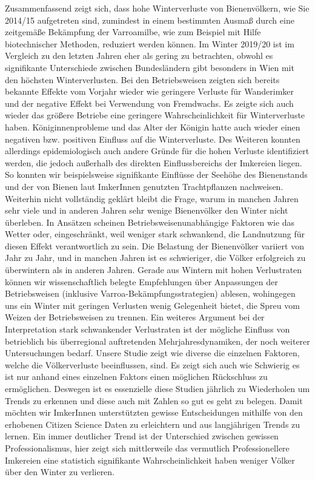 Zusammenfassend zeigt sich, dass hohe Winterverluste von Bienenvölkern, wie Sie 2014/15 aufgetreten sind, zumindest in einem bestimmten Ausmaß durch eine zeitgemäße Bekämpfung der Varroamilbe, wie zum Beispiel mit Hilfe biotechnischer Methoden, reduziert werden können.
\newline
Im Winter 2019/20 ist im Vergleich zu den letzten Jahren eher als gering zu betrachten, obwohl es signifikante Unterschiede zwischen Bundesländern gibt besonders in Wien mit den höchsten Winterverlusten. Bei den Betriebsweisen zeigten sich bereits bekannte Effekte vom Vorjahr wieder wie geringere Verluste für Wanderimker und der negative Effekt bei Verwendung von Fremdwachs. Es zeigte sich auch wieder das größere Betriebe eine geringere Wahrscheinlichkeit für Winterverluste haben.
\newline
Königinnenprobleme und das Alter der Königin hatte auch wieder einen negativen bzw. positiven Einfluss auf die Winterverluste. Des Weiteren konnten allerdings epidemiologisch auch andere Gründe für die hohen Verluste identifiziert werden, die jedoch außerhalb des direkten Einflussbereichs der Imkereien liegen. So konnten wir beispielsweise signifikante Einflüsse der Seehöhe des Bienenstands und der von Bienen laut ImkerInnen genutzten Trachtpflanzen nachweisen.
\newline
Weiterhin nicht vollständig geklärt bleibt die Frage, warum in manchen Jahren sehr viele und in anderen Jahren sehr wenige Bienenvölker den Winter nicht überleben. In Ansätzen scheinen Betriebsweisenunabhängige Faktoren wie das Wetter \citep{switanek2017} oder, eingeschränkt, weil weniger stark schwankend, die Landnutzung \citep{kuchling2018} für diesen Effekt verantwortlich zu sein.
\newline
Die Belastung der Bienenvölker variiert von Jahr zu Jahr, und in manchen Jahren ist es schwieriger, die Völker erfolgreich zu überwintern als in anderen Jahren. Gerade aus Wintern mit hohen Verlustraten können wir wissenschaftlich belegte Empfehlungen über Anpassungen der Betriebsweisen (inklusive Varroa-Bekämpfungsstrategien) ablesen, wohingegen uns ein Winter mit geringen Verlusten wenig Gelegenheit bietet, die Spreu vom Weizen der Betriebsweisen zu trennen. Ein weiteres Argument bei der Interpretation stark schwankender Verlustraten ist der mögliche Einfluss von betrieblich bis überregional auftretenden Mehrjahresdynamiken, der noch weiterer Untersuchungen bedarf.
\newline
Unsere Studie zeigt wie diverse die einzelnen Faktoren, welche die Völkerverluste beeinflussen, sind. Es zeigt sich auch wie Schwierig es ist nur anhand eines einzelnen Faktors einen möglichen Rückschluss zu ermöglichen. Deswegen ist es essenzielle diese Studien jährlich zu Wiederholen um Trends zu erkennen und diese auch mit Zahlen so gut es geht zu belegen. Damit möchten wir ImkerInnen unterstützten gewisse Entscheidungen mithilfe von den erhobenen Citizen Science Daten zu erleichtern und aus langjährigen Trends zu lernen. Ein immer deutlicher Trend ist der Unterschied zwischen gewissen Professionalismus, hier zeigt sich mittlerweile das vermutlich Professionellere Imkereien eine statistich signifikante Wahrscheinlichkeit haben weniger Völker über den Winter zu verlieren.